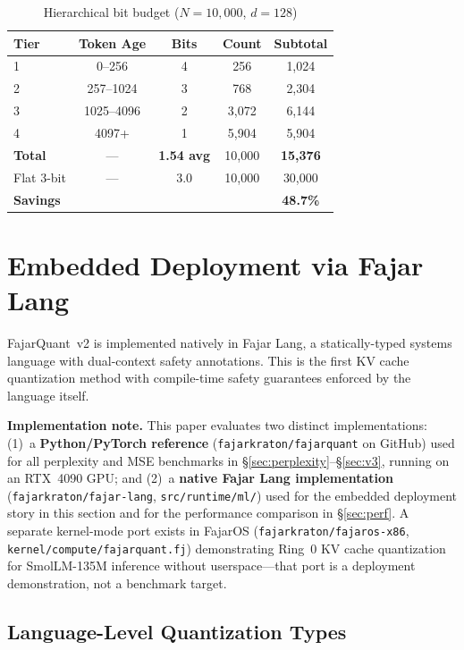 \documentclass{article}
\begin{document}
\begin{table}[t]
\centering
\small
\caption{Hierarchical bit budget ($N{=}10{,}000$, $d{=}128$)}
\label{tab:budget}
\setlength{\tabcolsep}{5pt}
\begin{tabular}{lcccc}
\toprule
Tier & Token Age & Bits & Count & Subtotal \\
\midrule
1 & 0--256 & 4 & 256 & 1,024 \\
2 & 257--1024 & 3 & 768 & 2,304 \\
3 & 1025--4096 & 2 & 3,072 & 6,144 \\
4 & 4097+ & 1 & 5,904 & 5,904 \\
\midrule
\textbf{Total} & --- & \textbf{1.54 avg} & 10,000 & \textbf{15,376} \\
Flat 3-bit & --- & 3.0 & 10,000 & 30,000 \\
\textbf{Savings} & & & & \textbf{48.7\%} \\
\bottomrule
\end{tabular}
\end{table}

\section{Embedded Deployment via Fajar Lang}
\label{sec:embedded}

FajarQuant~v2 is implemented natively in Fajar Lang, a statically-typed
systems language with dual-context safety annotations. This is the first
KV cache quantization method with compile-time safety guarantees
enforced by the language itself.

\textbf{Implementation note.} This paper evaluates two distinct
implementations: (1)~a \textbf{Python/PyTorch reference}
(\texttt{fajarkraton/fajarquant} on GitHub) used for all perplexity
and MSE benchmarks in \S\ref{sec:perplexity}--\S\ref{sec:v3},
running on an RTX~4090 GPU; and (2)~a \textbf{native Fajar Lang
implementation} (\texttt{fajarkraton/fajar-lang}, \texttt{src/runtime/ml/})
used for the embedded deployment story in this section and for the
performance comparison in \S\ref{sec:perf}. A separate kernel-mode port
exists in FajarOS (\texttt{fajarkraton/fajaros-x86},
\texttt{kernel/compute/fajarquant.fj}) demonstrating Ring~0 KV cache
quantization for SmolLM-135M inference without userspace---that port is
a deployment demonstration, not a benchmark target.

\subsection{Language-Level Quantization Types}
\end{document}
